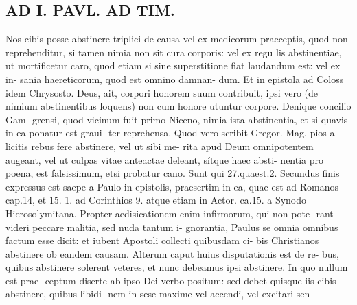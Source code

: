 \documentclass{article}
\begin{document}
\begin{pages}
\section*{AD I. PAVL. AD TIM. }
\marginpar{[ p.310 ]}Nos cibis posse abstinere triplici de causa vel ex medicorum praeceptis, quod non reprehenditur, si tamen nimia non sit cura corporis: vel ex regu lis abstinentiae, ut mortificetur caro, quod etiam si sine superstitione fiat laudandum est: vel ex in- sania haereticorum, quod est omnino damnan- dum. Et in epistola ad Coloss idem Chrysosto. Deus, ait, corpori honorem suum contribuit, ipsi vero (de nimium abstinentibus loquens) non cum honore utuntur corpore. Denique concilio Gam- grensi, quod vicinum fuit primo Niceno, nimia ista abstinentia, et si quavis in ea ponatur est graui- ter reprehensa. Quod vero scribit Gregor. Mag. pios a licitis rebus fere abstinere, vel ut sibi me- rita apud Deum omnipotentem augeant, vel ut culpas vitae anteactae deleant, sítque haec absti- nentia pro poena, est falsissimum, etsi probatur cano. Sunt qui 27.quaest.2. Secundus finis expressus est saepe a Paulo in epistolis, praesertim in ea, quae est ad Romanos cap.14, et 15. 1. ad Corinthios 9. atque etiam in Actor. ca.15. a Synodo Hierosolymitana. Propter aedisicationem enim infirmorum, qui non pote- rant videri peccare malitia, sed nuda tantum i- gnorantia, Paulus se omnia omnibus factum esse dicit: et iubent Apostoli collecti quibusdam ci- bis Christianos abstinere ob eandem causam. Alterum caput huius disputationis est de re- bus, quibus abstinere solerent veteres, et nunc debeamus ipsi abstinere. In quo nullum est prae- ceptum diserte ab ipso Dei verbo positum: sed debet quisque iis cibis abstinere, quibus libidi- nem in sese maxime vel accendi, vel excitari sen- 

\end{pages}
\end{document}

